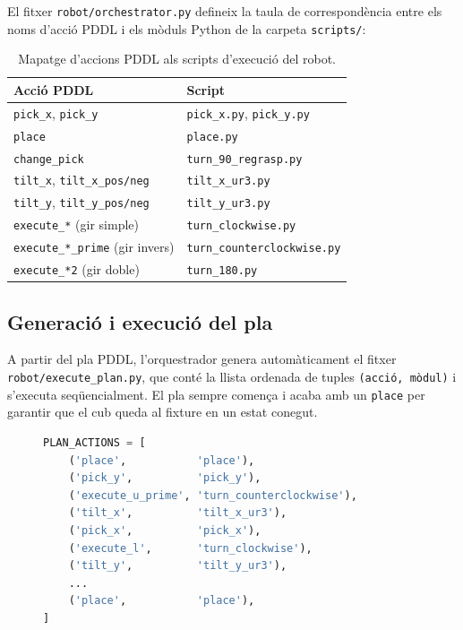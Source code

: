 \documentclass[12pt, a4paper]{article}
\begin{document}
El fitxer \texttt{robot/orchestrator.py} defineix la taula de correspondència entre els noms d'acció PDDL i els mòduls Python de la carpeta \texttt{scripts/}:

\begin{table}[H]
  \centering
  \small
  \begin{tabular}{ll}
    \toprule
    \textbf{Acció PDDL} & \textbf{Script} \\
    \midrule
    \texttt{pick\_x}, \texttt{pick\_y}             & \texttt{pick\_x.py}, \texttt{pick\_y.py} \\
    \texttt{place}                                  & \texttt{place.py} \\
    \texttt{change\_pick}                           & \texttt{turn\_90\_regrasp.py} \\
    \texttt{tilt\_x}, \texttt{tilt\_x\_pos/neg}    & \texttt{tilt\_x\_ur3.py} \\
    \texttt{tilt\_y}, \texttt{tilt\_y\_pos/neg}    & \texttt{tilt\_y\_ur3.py} \\
    \texttt{execute\_*} (gir simple)                & \texttt{turn\_clockwise.py} \\
    \texttt{execute\_*\_prime} (gir invers)         & \texttt{turn\_counterclockwise.py} \\
    \texttt{execute\_*2} (gir doble)                & \texttt{turn\_180.py} \\
    \bottomrule
  \end{tabular}
  \caption{Mapatge d'accions PDDL als scripts d'execució del robot.}
  \label{tab:action_mapping}
\end{table}

\subsection{Generació i execució del pla}

A partir del pla PDDL, l'orquestrador genera automàticament el fitxer \texttt{robot/execute\_plan.py}, que conté la llista ordenada de tuples \texttt{(acció, mòdul)} i s'executa seqüencialment. El pla sempre comença i acaba amb un \texttt{place} per garantir que el cub queda al fixture en un estat conegut.

\begin{figure}[H]
\begin{lstlisting}[language=Python, caption={Fragment de \texttt{execute\_plan.py} autogenerat. Cada tupla associa el nom d'acció PDDL amb el mòdul Python que l'executa al robot real.}, basicstyle=\ttfamily\scriptsize]
PLAN_ACTIONS = [
    ('place',           'place'),
    ('pick_y',          'pick_y'),
    ('execute_u_prime', 'turn_counterclockwise'),
    ('tilt_x',          'tilt_x_ur3'),
    ('pick_x',          'pick_x'),
    ('execute_l',       'turn_clockwise'),
    ('tilt_y',          'tilt_y_ur3'),
    ...
    ('place',           'place'),
]
\end{lstlisting}
\end{figure}
\end{document}
